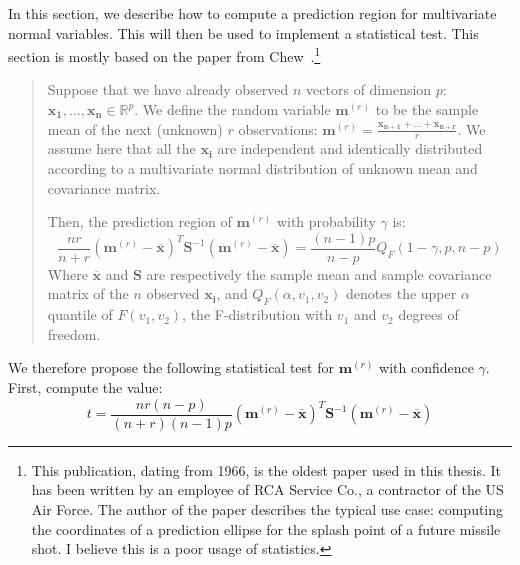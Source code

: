             In this section, we describe how to compute a prediction region for multivariate normal variables. This will
            then be used to implement a statistical test.  This section is mostly based on the paper from
            Chew~\cite[Section~4.4]{chew}.\footnote{This publication, dating from 1966, is the oldest paper used in this
            thesis. It has been written by an employee of RCA Service Co., a contractor of the US Air Force. The
            author of the paper describes the typical use case: computing the coordinates of a prediction ellipse
            for the splash point of a future missile shot. I believe this is a poor usage of statistics.}
            \begin{quote}
                Suppose that we have already observed \(n\) vectors of dimension \(p\): \(\bm{x_1},\dots,\bm{x_n} \in
                \mathbb{R}^p\). We define the random variable \(\bm{m}^{(r)}\) to be the sample mean of the next (unknown)
                \(r\) observations: \(\bm{m}^{(r)}= \frac{\bm{x_{n+1}}+\dots+\bm{x_{n+r}}}{r}\). We assume here that all the
                \(\bm{x_i}\) are independent and identically distributed according to a multivariate normal distribution
                of unknown mean and covariance matrix.

                Then, the prediction region of \(\bm{m}^{(r)}\) with probability \(\gamma\) is:
                \begin{equation}\label{eqn:experiment:non_regression:pred_region}
                    \frac{nr}{n+r} (\bm{m}^{(r)} - \overline{\bm{x}})^T \bm{S}^{-1}(\bm{m}^{(r)} -
                    \overline{\bm{x}})
                    =
                    \frac{(n-1)p}{n-p} Q_F(1-\gamma, p, n-p)
                \end{equation}
                Where \(\overline{\bm{x}}\) and \(\bm{S}\) are respectively the sample mean and sample covariance matrix of
                the \(n\) observed \(\bm{x_i}\), and \(Q_F(\alpha,v_1,v_2)\) denotes the upper \(\alpha\) quantile of
                \(F(v_1, v_2)\), the F-distribution with \(v_1\) and \(v_2\) degrees of freedom.
            \end{quote}

            We therefore propose the following statistical test for \(\bm{m}^{(r)}\) with confidence \(\gamma\). First,
            compute the value:
            \begin{equation}\label{eqn:experiment:non_regression:test}
                t = \frac{nr(n-p)}{(n+r)(n-1)p} (\bm{m}^{(r)} - \overline{\bm{x}})^T \bm{S}^{-1}(\bm{m}^{(r)} -
                \overline{\bm{x}})
            \end{equation}

